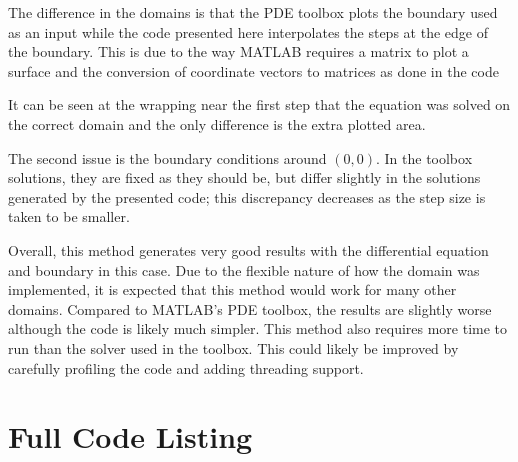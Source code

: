 \documentclass[10pt,a4paper]{article}
\begin{document}
The difference in the domains is that the PDE toolbox plots the boundary used as an input while the code presented here interpolates the steps at the edge of the boundary. This is due to the way MATLAB requires a matrix to plot a surface and the conversion of coordinate vectors to matrices as done in the code



It can be seen  at the wrapping near the first step that the equation was solved on the correct domain and the only difference is the extra plotted area.

The second issue is the boundary conditions around $(0, 0)$. In the toolbox solutions, they are fixed as they should be, but  differ slightly in the solutions generated by the presented code; this discrepancy decreases as the step size is taken to be smaller.

Overall, this method generates very good results with the differential equation and boundary in this case. Due to the flexible nature of how the domain was implemented, it is expected that this method would work for many other domains. Compared to MATLAB's PDE toolbox, the results are slightly worse although the code is likely much simpler. This method also requires more time to run than the solver used in the toolbox. This could likely be improved by carefully profiling the code and adding threading support.

\newpage
\section*{Full Code Listing}

\end{document}
